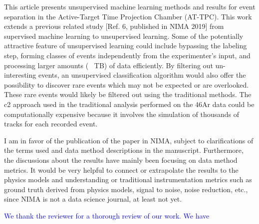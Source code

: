 \documentclass[12pt]{article}
\begin{document}
This article presents unsupervised machine learning methods and results for event separation in
the Active-Target Time Projection Chamber (AT-TPC). This work extends a previous related
study [Ref. 6, published in NIMA 2019] from supervised machine learning to unsupervised
learning. Some of the potentially attractive feature of unsupervised learning could include
bypassing the labeling step, forming classes of events independently from the experimenter’s input,
and processing larger amounts (~ TB) of data efficiently. By filtering out un-interesting events, an
unsupervised classification algorithm would also offer the possibility to discover rare events which
may not be expected or are overlooked. These rare events would likely be filtered out using the
traditional methods. The c2 approach used in the traditional analysis performed on the 46Ar data
could be computationally expensive because it involves the simulation of thousands of tracks for
each recorded event.


I am in favor of the publication of the paper in NIMA, subject to clarifications of the terms used
and data method descriptions in the manuscript. Furthermore, the discussions about the results
have mainly been focusing on data method metrics. It would be very helpful to connect or
extrapolate the results to the physics models and understanding or traditional instrumentation
metrics such as ground truth derived from physics models, signal to noise, noise reduction, etc.,
since NIMA is not a data science journal, at least not yet.


\textcolor{blue}{We thank the reviewer for a thorough review of our work. We have }
\end{document}
